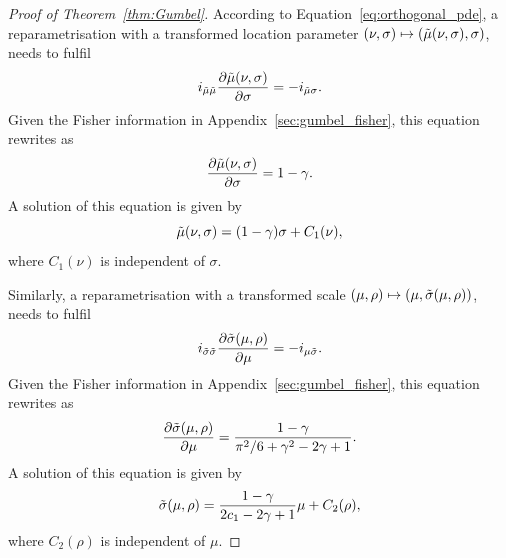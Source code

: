 \documentclass{article}
\newcommand{\1}{\mathds{1}}
\newtheorem{proposition}{Proposition}[section]
\theoremstyle{definition}
\begin{document}
\begin{proof}[Proof of Theorem~\ref{thm:Gumbel}]
According to Equation~\eqref{eq:orthogonal_pde}, a reparametrisation with a transformed location parameter $(\nu,\sigma) \mapsto (\Tilde{\mu}(\nu,\sigma),\sigma)$, needs to fulfil
\begin{equation*}
    i_{\Tilde{\mu}\Tilde{\mu}} \frac{\partial \Tilde{\mu}(\nu,\sigma)}{\partial \sigma}= - i_{\Tilde{\mu}\sigma}.
\end{equation*}
Given the Fisher information in Appendix~\ref{sec:gumbel_fisher}, this equation rewrites as
\begin{equation*}
    \frac{\partial \Tilde{\mu}(\nu,\sigma)}{\partial \sigma} = 1- \gamma.
\end{equation*}
A solution of this equation is given by
\begin{equation*}
\Tilde{\mu}(\nu,\sigma) = (1- \gamma)\sigma + C_1(\nu),
\end{equation*}
where $C_1(\nu)$ is independent of $\sigma$.


Similarly, a reparametrisation with a transformed scale  $(\mu,\rho) \mapsto (\mu,\Tilde{\sigma}(\mu,\rho))$, needs to fulfil
\begin{equation*}
    i_{\Tilde{\sigma}\Tilde{\sigma}} \frac{\partial \Tilde{\sigma}(\mu,\rho)}{\partial \mu}= - i_{\mu\Tilde{\sigma}}.
\end{equation*}
Given the Fisher information in Appendix~\ref{sec:gumbel_fisher}, this equation rewrites as
\begin{equation*}
    \frac{\partial \Tilde{\sigma}(\mu,\rho)}{\partial \mu} = \frac{1- \gamma}{\pi^2/6+\gamma^2 - 2 \gamma +1}.
\end{equation*}
A solution of this equation is given by
\begin{equation*}
\Tilde{\sigma}(\mu,\rho) = \frac{1- \gamma}{2c_1 -2\gamma+1}\mu + C_2(\rho),
\end{equation*}
where $C_2(\rho)$ is independent of $\mu$.
\end{proof}



%
\end{document}
